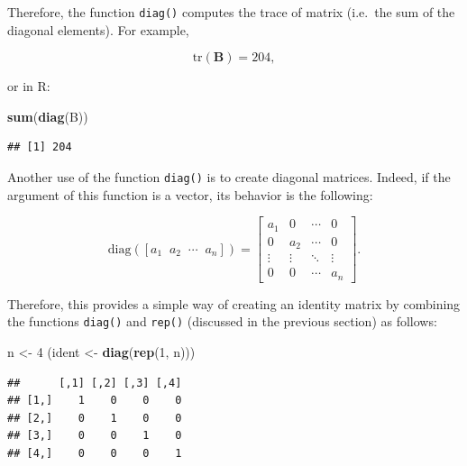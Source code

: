 \documentclass[12pt,]{krantz}
\newenvironment{Shaded}{\begin{snugshade}}{\end{snugshade}}
\newcommand{\KeywordTok}[1]{\textcolor[rgb]{0.27,0.27,0.27}{\textbf{#1}}}
\newcommand{\DecValTok}[1]{\textcolor[rgb]{0.06,0.06,0.06}{#1}}
\newcommand{\StringTok}[1]{\textcolor[rgb]{0.5,0.5,0.5}{#1}}
\newcommand{\NormalTok}[1]{#1}
\begin{document}
Therefore, the function \texttt{diag()} computes the trace of matrix
(i.e.~the sum of the diagonal elements). For example,

\begin{equation*}
\text{tr} \left( \mathbf{B} \right) = 204,
\end{equation*}

or in R:

\begin{Shaded}
\begin{Highlighting}[]
\KeywordTok{sum}\NormalTok{(}\KeywordTok{diag}\NormalTok{(B))}
\end{Highlighting}
\end{Shaded}

\begin{verbatim}
## [1] 204
\end{verbatim}

Another use of the function \texttt{diag()} is to create diagonal
matrices. Indeed, if the argument of this function is a vector, its
behavior is the following:

\begin{equation*}
  \text{diag} \left(\left[a_1 \;\; a_2 \;\; \cdots \;\; a_n\right]\right) = \left[
\begin{matrix}
a_1     & 0       & \cdots & 0  \\
0       & a_2     & \cdots & 0  \\
\vdots  & \vdots  & \ddots       & \vdots    \\
0       & 0       &   \cdots     & a_n
\end{matrix}
\right].
\end{equation*}

Therefore, this provides a simple way of creating an identity matrix by
combining the functions \texttt{diag()} and \texttt{rep()} (discussed in
the previous section) as follows:

\begin{Shaded}
\begin{Highlighting}[]
\NormalTok{n <-}\StringTok{ }\DecValTok{4}
\NormalTok{(ident <-}\StringTok{ }\KeywordTok{diag}\NormalTok{(}\KeywordTok{rep}\NormalTok{(}\DecValTok{1}\NormalTok{, n)))}
\end{Highlighting}
\end{Shaded}

\begin{verbatim}
##      [,1] [,2] [,3] [,4]
## [1,]    1    0    0    0
## [2,]    0    1    0    0
## [3,]    0    0    1    0
## [4,]    0    0    0    1
\end{verbatim}
\end{document}
